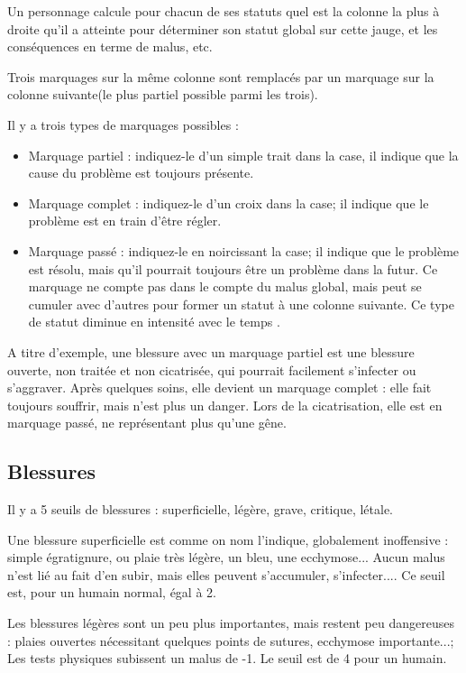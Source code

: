 \documentclass[10pt,a4paper,twocolumn]{book}
\begin{document}
Un personnage calcule pour chacun de ses statuts quel est la colonne la plus à droite qu'il a atteinte pour déterminer son statut global sur cette jauge, et les conséquences en terme de malus, etc.

Trois marquages sur la même colonne sont remplacés par un marquage sur la colonne suivante(le plus partiel possible parmi les trois).

Il y a trois types de marquages possibles :
\begin{itemize}
\item Marquage partiel : indiquez-le d'un simple trait dans la case, il indique que la cause du problème est toujours présente.
\item Marquage complet : indiquez-le d'un croix dans la case; il indique que le problème est en train d'être régler.
\item Marquage passé : indiquez-le en noircissant la case; il indique que le problème est résolu, mais qu'il pourrait toujours être un problème dans la futur. Ce marquage ne compte pas dans le compte du malus global, mais peut se cumuler avec d'autres pour former un statut à une colonne suivante. Ce type de statut diminue en intensité avec le temps .
\end{itemize}

A titre d'exemple, une blessure avec un marquage partiel est une blessure ouverte, non traitée et non cicatrisée, qui pourrait facilement s'infecter ou s'aggraver. Après quelques soins, elle devient un marquage complet : elle fait toujours souffrir, mais n'est plus un danger. Lors de la cicatrisation, elle est en marquage passé, ne représentant plus qu'une gêne.
\subsection{Blessures}
Il y a 5 seuils de blessures : superficielle, légère, grave, critique, létale.

Une blessure superficielle est comme on nom l'indique, globalement inoffensive : simple égratignure, ou plaie très légère, un bleu, une ecchymose... Aucun malus n'est lié au fait d'en subir, mais elles peuvent s'accumuler, s'infecter....  Ce seuil est, pour un humain normal, égal à 2.

Les blessures légères sont un peu plus importantes, mais restent peu dangereuses : plaies ouvertes nécessitant quelques points de sutures, ecchymose importante...; Les tests physiques subissent un malus de -1. Le seuil est de 4 pour un humain.
\end{document}
